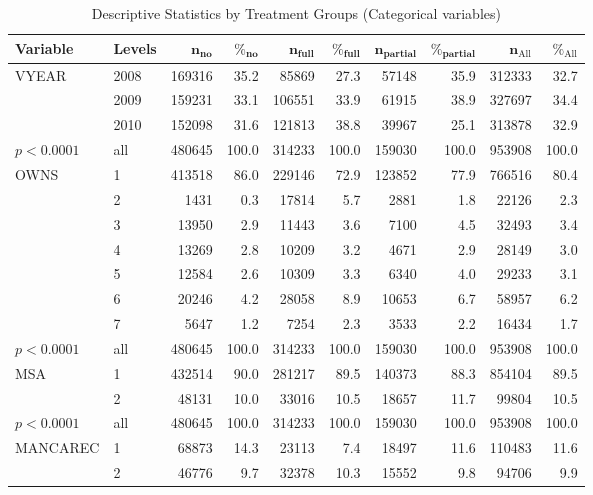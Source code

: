 \documentclass[11pt, oneside]{article}        %
\begin{document}
\begin{table}[ht]
\centering
\caption{Descriptive Statistics by Treatment Groups (Categorical variables)} 
{\footnotesize
\begin{tabular}{ll|rr|rr|rr|rr}
 \textbf{Variable} & \textbf{Levels} & $\mathbf{n_{no}}$ & $\mathbf{\%_{no}}$ & $\mathbf{n_{full}}$ & $\mathbf{\%_{full}}$ & $\mathbf{n_{partial}}$ & $\mathbf{\%_{partial}}$ & $\mathbf{n_{\mathrm{All}}}$ & $\mathbf{\%_{\mathrm{All}}}$ \\ 
  \hline
VYEAR & 2008 & 169316 & 35.2 & 85869 & 27.3 & 57148 & 35.9 & 312333 & 32.7 \\ 
   & 2009 & 159231 & 33.1 & 106551 & 33.9 & 61915 & 38.9 & 327697 & 34.4 \\ 
   & 2010 & 152098 & 31.6 & 121813 & 38.8 & 39967 & 25.1 & 313878 & 32.9 \\ 
   \hline
$p< 0.0001$ & all & 480645 & 100.0 & 314233 & 100.0 & 159030 & 100.0 & 953908 & 100.0 \\ 
   \hline
\hline
OWNS & 1 & 413518 & 86.0 & 229146 & 72.9 & 123852 & 77.9 & 766516 & 80.4 \\ 
   & 2 & 1431 & 0.3 & 17814 & 5.7 & 2881 & 1.8 & 22126 & 2.3 \\ 
   & 3 & 13950 & 2.9 & 11443 & 3.6 & 7100 & 4.5 & 32493 & 3.4 \\ 
   & 4 & 13269 & 2.8 & 10209 & 3.2 & 4671 & 2.9 & 28149 & 3.0 \\ 
   & 5 & 12584 & 2.6 & 10309 & 3.3 & 6340 & 4.0 & 29233 & 3.1 \\ 
   & 6 & 20246 & 4.2 & 28058 & 8.9 & 10653 & 6.7 & 58957 & 6.2 \\ 
   & 7 & 5647 & 1.2 & 7254 & 2.3 & 3533 & 2.2 & 16434 & 1.7 \\ 
   \hline
$p< 0.0001$ & all & 480645 & 100.0 & 314233 & 100.0 & 159030 & 100.0 & 953908 & 100.0 \\ 
   \hline
\hline
MSA & 1 & 432514 & 90.0 & 281217 & 89.5 & 140373 & 88.3 & 854104 & 89.5 \\ 
   & 2 & 48131 & 10.0 & 33016 & 10.5 & 18657 & 11.7 & 99804 & 10.5 \\ 
   \hline
$p< 0.0001$ & all & 480645 & 100.0 & 314233 & 100.0 & 159030 & 100.0 & 953908 & 100.0 \\ 
   \hline
\hline
MANCAREC & 1 & 68873 & 14.3 & 23113 & 7.4 & 18497 & 11.6 & 110483 & 11.6 \\ 
   & 2 & 46776 & 9.7 & 32378 & 10.3 & 15552 & 9.8 & 94706 & 9.9 \\ 

\end{tabular}}
\end{table}
\end{document}

